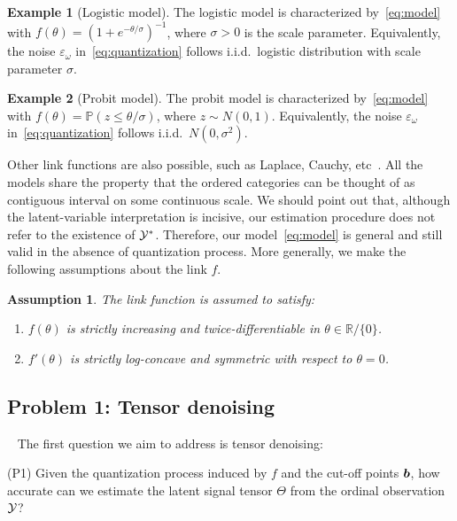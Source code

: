 \documentclass{article}
\theoremstyle{plain}
\newtheorem{assumption}{Assumption}
\theoremstyle{definition}
\newtheorem{example}{Example}
\begin{document}
\begin{example}[Logistic model] The logistic model is characterized by~\eqref{eq:model} with $f(\theta)=(1+e^{-\theta/\sigma})^{-1}$, where $\sigma>0$ is the scale parameter. Equivalently, the noise $\varepsilon_\omega$ in~\eqref{eq:quantization} follows i.i.d.\ logistic distribution with scale parameter $\sigma$. 
\end{example}
\begin{example}[Probit model] The probit model is characterized by~\eqref{eq:model} with
$f(\theta)=\mathbb{P}(z\leq \theta/\sigma)$, where $z\sim N(0,1)$. Equivalently, the noise $\varepsilon_\omega$ in~\eqref{eq:quantization} follows i.i.d.\ $N(0,\sigma^2)$.
\end{example}
Other link functions are also possible, such as Laplace, Cauchy, etc~\cite{mccullagh1980regression}. All the models share the property that the ordered categories can be thought of as contiguous interval on some continuous scale. We should point out that, although the latent-variable interpretation is incisive, our estimation procedure does not refer to the existence of $\mathcal{Y}^*$. Therefore, our model~\eqref{eq:model} is general and still valid in the absence of quantization process. More generally, we make the following assumptions about the link $f$. 

\begin{assumption}\label{ass:link}
The link function is assumed to satisfy:
\vspace{-.4cm}
\begin{enumerate}
\item $f(\theta)$ is strictly increasing and twice-differentiable in $\theta\in\mathbb{R}/\{0\}$.
\vspace{-.2cm}
\item $f'(\theta)$ is strictly log-concave and symmetric with respect to $\theta=0$. 
\end{enumerate}
\end{assumption}

\subsection{Problem 1: Tensor denoising}~\label{sec:denoising}
The first question we aim to address is tensor denoising:

(P1) Given the quantization process induced by $f$ and the cut-off points $\bm{b}$, how accurate can we estimate the latent signal tensor $\Theta$ from the ordinal observation $\mathcal{Y}$? 
\end{document}
